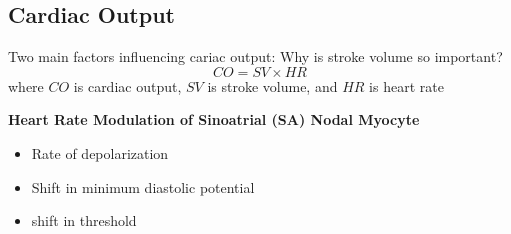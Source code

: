 \documentclass[11pt,fleqn]{book}
\begin{document}
\newpage
\subsection{Cardiac Output}
\begin{theorem}
    Two main factors influencing cariac output: Why is stroke volume so important?
    $$CO=SV\times HR$$
    where $CO$ is cardiac output, $SV$ is stroke volume, and $HR$ is heart rate
\end{theorem}

\textbf{Heart Rate Modulation of
Sinoatrial (SA) Nodal Myocyte}
\begin{itemize}
    \item Rate of depolarization
    \item Shift in minimum diastolic potential\
    \item shift in threshold
\end{itemize}
\end{document}
